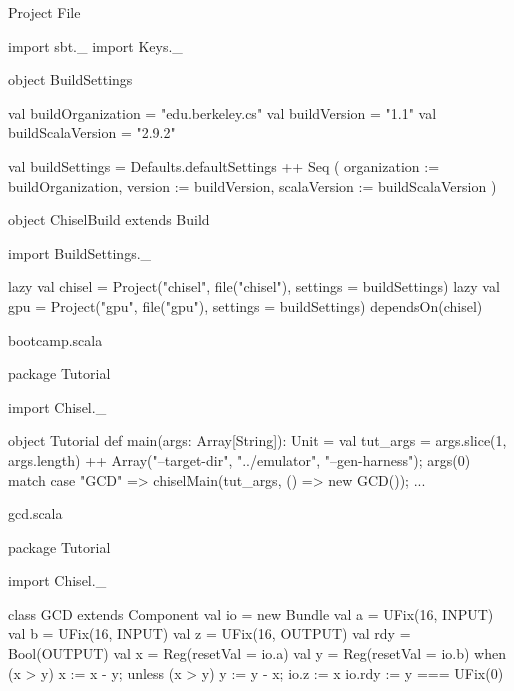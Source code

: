 \documentclass[xcolor=pdflatex,dvipsnames,table]{beamer}
\newenvironment{FramedVerb}%
{\VerbatimEnvironment
\begin{Sbox}\begin{minipage}{.94\textwidth}\begin{Verbatim}}%
{\end{Verbatim}\end{minipage}\end{Sbox}
\setlength{\fboxsep}{8pt}\fbox{\TheSbox}}
\begin{document}
\begin{frame}{Project File}
\begin{scala}
import sbt._
import Keys._

object BuildSettings {
  val buildOrganization = "edu.berkeley.cs"
  val buildVersion = "1.1"
  val buildScalaVersion = "2.9.2"

  val buildSettings = Defaults.defaultSettings ++ Seq (
    organization := buildOrganization,
    version      := buildVersion,
    scalaVersion := buildScalaVersion
  )
}

object ChiselBuild extends Build {
  import BuildSettings._

  lazy val chisel = 
    Project("chisel", file("chisel"), 
      settings = buildSettings)
  lazy val gpu =
    Project("gpu", file("gpu"), settings = buildSettings) 
      dependsOn(chisel)
}
\end{scala}
\end{frame}

\begin{frame}{bootcamp.scala}
\begin{scala}
package Tutorial {

import Chisel._

object Tutorial {
  def main(args: Array[String]): Unit = { 
    val tut_args = args.slice(1, args.length) ++ 
      Array("--target-dir", "../emulator", 
            "--gen-harness");
    args(0) match {
      case "GCD" => 
        chiselMain(tut_args, () => new GCD());
      ...
    }
  }
}

}
\end{scala}
\end{frame}

\begin{frame}{gcd.scala}
\begin{scala}
package Tutorial {

import Chisel._

class GCD extends Component {
  val io = new Bundle {
    val a   = UFix(16, INPUT)
    val b   = UFix(16, INPUT)
    val z   = UFix(16, OUTPUT)
    val rdy = Bool(OUTPUT)
  }
  val x  = Reg(resetVal = io.a)
  val y  = Reg(resetVal = io.b)
  when   (x > y) { x := x - y; } 
  unless (x > y) { y := y - x; }
  io.z   := x
  io.rdy := y === UFix(0)
}

}
\end{scala}
\end{frame}
\end{document}
